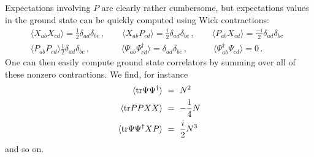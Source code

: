 \documentclass[a4paper,11pt]{article}
\newcommand{\tr}{{\rm {tr}}}
\numberwithin{equation}{section}
\begin{document}
Expectations involving $P$ are clearly rather cumbersome, but expectations values in the ground state can be quickly computed using Wick contractions:
%
\begin{align}
    \langle X_{ab}X_{cd} \rangle = \frac{1}{2} \delta_{ad} \delta_{bc} \, , \qquad \langle X_{ab}P_{cd} \rangle = \frac{i}{2} \delta_{ad} \delta_{bc} \, ,\qquad \langle P_{ab}X_{cd} \rangle = \frac{-i}{2} \delta_{ad} \delta_{bc} \\
    \langle P_{ab} P_{cd} \rangle \frac{1}{2} \delta_{ad} \delta_{bc} \, , \quad \ \ \, \qquad \langle \Psi_{ab}\Psi^\dagger_{cd} \rangle =  \delta_{ad} \delta_{bc} \, , \qquad \quad \langle \Psi^\dagger_{ab}\Psi_{cd} \rangle = 0 \, . \qquad \quad 
\end{align}
%
One can then easily compute ground state correlators by summing over all of these nonzero contractions. We find, for instance
%
\begin{align}
    \langle \tr \Psi \Psi^\dagger \rangle \ &= \ N^2 \\
    \langle \tr PPXX \rangle \ &= \ -\frac{1}{4} N \\
    \langle \tr \Psi \Psi^\dagger X P \rangle \ &= \ \frac{i}{2} N^3
\end{align}
%
and so on.


\section*{}


\end{document}
